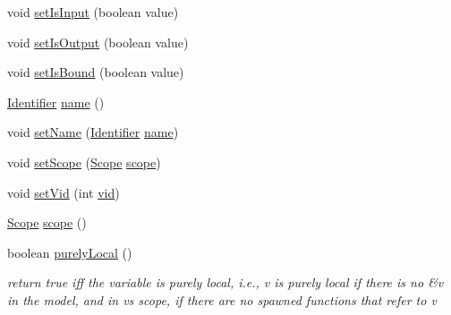 \begin{DoxyCompactItemize}
\item 
void \hyperlink{interfaceedu_1_1udel_1_1cis_1_1vsl_1_1civl_1_1model_1_1IF_1_1variable_1_1Variable_af14803567487d1fbd290e4c3fd1639a9}{set\+Is\+Input} (boolean value)
\item 
void \hyperlink{interfaceedu_1_1udel_1_1cis_1_1vsl_1_1civl_1_1model_1_1IF_1_1variable_1_1Variable_a3ac7c9404f320adf8f18b00a78758bc2}{set\+Is\+Output} (boolean value)
\item 
void \hyperlink{interfaceedu_1_1udel_1_1cis_1_1vsl_1_1civl_1_1model_1_1IF_1_1variable_1_1Variable_ac516580c6f7bb7dec604fbd8a18d39e0}{set\+Is\+Bound} (boolean value)
\item 
\hyperlink{interfaceedu_1_1udel_1_1cis_1_1vsl_1_1civl_1_1model_1_1IF_1_1Identifier}{Identifier} \hyperlink{interfaceedu_1_1udel_1_1cis_1_1vsl_1_1civl_1_1model_1_1IF_1_1variable_1_1Variable_a9fa9a0292aee9f4e90ad288a70a14b2f}{name} ()
\item 
void \hyperlink{interfaceedu_1_1udel_1_1cis_1_1vsl_1_1civl_1_1model_1_1IF_1_1variable_1_1Variable_ae48cba81c6020e73b57809a75572f82c}{set\+Name} (\hyperlink{interfaceedu_1_1udel_1_1cis_1_1vsl_1_1civl_1_1model_1_1IF_1_1Identifier}{Identifier} \hyperlink{interfaceedu_1_1udel_1_1cis_1_1vsl_1_1civl_1_1model_1_1IF_1_1variable_1_1Variable_a9fa9a0292aee9f4e90ad288a70a14b2f}{name})
\item 
void \hyperlink{interfaceedu_1_1udel_1_1cis_1_1vsl_1_1civl_1_1model_1_1IF_1_1variable_1_1Variable_a20bcf5b999a5c7dfd103774fa514789d}{set\+Scope} (\hyperlink{interfaceedu_1_1udel_1_1cis_1_1vsl_1_1civl_1_1model_1_1IF_1_1Scope}{Scope} \hyperlink{interfaceedu_1_1udel_1_1cis_1_1vsl_1_1civl_1_1model_1_1IF_1_1variable_1_1Variable_a4042cf8114e1622510d1a6001f061aee}{scope})
\item 
void \hyperlink{interfaceedu_1_1udel_1_1cis_1_1vsl_1_1civl_1_1model_1_1IF_1_1variable_1_1Variable_ab2c419b631f5eae53f08e85b5fb7d853}{set\+Vid} (int \hyperlink{interfaceedu_1_1udel_1_1cis_1_1vsl_1_1civl_1_1model_1_1IF_1_1variable_1_1Variable_a06a31f6ced900bf13bf45414e2e05b8b}{vid})
\item 
\hyperlink{interfaceedu_1_1udel_1_1cis_1_1vsl_1_1civl_1_1model_1_1IF_1_1Scope}{Scope} \hyperlink{interfaceedu_1_1udel_1_1cis_1_1vsl_1_1civl_1_1model_1_1IF_1_1variable_1_1Variable_a4042cf8114e1622510d1a6001f061aee}{scope} ()
\item 
boolean \hyperlink{interfaceedu_1_1udel_1_1cis_1_1vsl_1_1civl_1_1model_1_1IF_1_1variable_1_1Variable_aaee56b5478d2700bbbf4dcd5c5590ade}{purely\+Local} ()
\begin{DoxyCompactList}\small\item\em return true iff the variable is purely local, i.\+e., v is purely local if there is no \&v in the model, and in v\textquotesingle{}s scope, if there are no spawned functions that refer to v \end{DoxyCompactList}\item 

\end{DoxyCompactItemize}
